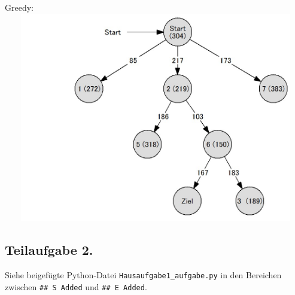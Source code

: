 \documentclass[
  a4paper,
  11pt,
]{scrartcl}
\begin{document}
Greedy:
\includegraphics*[width=400pt,height=260pt]{img/greedy.jpg}

\newpage

\subsection*{Teilaufgabe 2.}

Siehe beigefügte Python-Datei \verb|Hausaufgabe1_aufgabe.py| in den Bereichen zwischen \verb|## S Added| und \verb|## E Added|.
\end{document}
